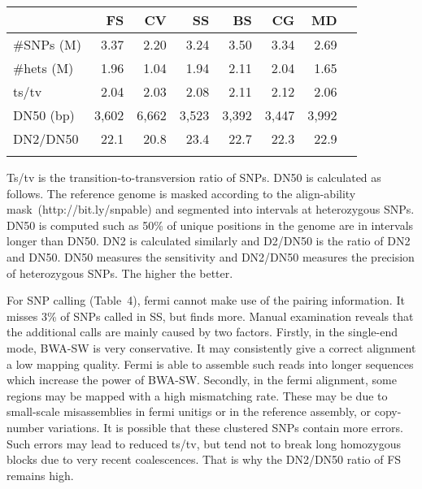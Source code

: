 \documentclass{bioinfo}
\begin{document}
\begin{table}[!htb]
{\begin{tabular}{p{2.3cm}rrrrrrr}
\toprule
& FS & CV & SS & BS & CG & MD \\
\midrule
\#SNPs (M) & 3.37 & 2.20 & 3.24 & 3.50 & 3.34 & 2.69\\
\#hets (M) & 1.96 & 1.04 & 1.94 & 2.11 & 2.04 & 1.65\\
ts/tv      & 2.04 & 2.03 & 2.08 & 2.11 & 2.12 & 2.06\\
DN50 (bp)  & 3,602& 6,662& 3,523& 3,392& 3,447&3,992\\
DN2/DN50   & 22.1 & 20.8 & 23.4 & 22.7 & 22.3 & 22.9\\
\botrule
\end{tabular}}{Ts/tv is the transition-to-transversion ratio of SNPs. DN50 is
calculated as follows. The reference genome is masked according to the
align-ability mask~(http://bit.ly/snpable) and segmented into intervals at
heterozygous SNPs. DN50 is computed such as 50\% of unique positions in the
genome are in intervals longer than DN50. DN2 is calculated similarly and
D2/DN50 is the ratio of DN2 and DN50. DN50 measures the sensitivity and
DN2/DN50 measures the precision of heterozygous SNPs. The higher the better.}

\end{table}

For SNP calling (Table~4), fermi cannot make use of the pairing information. It
misses 3\% of SNPs called in SS, but finds more. Manual examination reveals that
the additional calls are mainly caused by two factors. Firstly, in the
single-end mode, BWA-SW is very conservative. It may consistently give a
correct alignment a low mapping quality. Fermi is able to assemble such reads into
longer sequences which increase the power of BWA-SW. Secondly, in the fermi
alignment, some regions may be mapped with a high mismatching rate.  These may
be due to small-scale misassemblies in fermi unitigs or in the reference
assembly, or copy-number variations. It is possible that these clustered
SNPs contain more errors. Such errors may lead to reduced ts/tv, but tend
not to break long homozygous blocks due to very recent coalescences. That
is why the DN2/DN50 ratio of FS remains high.

\end{document}
